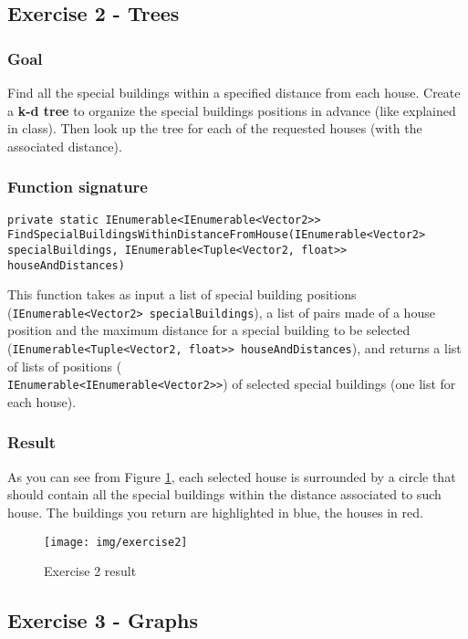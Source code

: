 \subsection*{Exercise 2 - Trees}

\subsubsection*{Goal}
Find all the special buildings within a specified distance from each house. Create a \textbf{k-d tree} to organize the special buildings positions in advance (like explained in class). Then look up the tree for each of the requested houses (with the associated distance).

\subsubsection*{Function signature} 
\begin{lstlisting}
private static IEnumerable<IEnumerable<Vector2>> FindSpecialBuildingsWithinDistanceFromHouse(IEnumerable<Vector2> specialBuildings, IEnumerable<Tuple<Vector2, float>> houseAndDistances)
\end{lstlisting}

\noindent
This function takes as input a list of special building positions (\texttt{IEnumerable<Vector2> specialBuildings}), a list of pairs made of a house position and the maximum distance for a special building to be selected (\texttt{IEnumerable<Tuple<Vector2, float>> houseAndDistances}), and returns a list of lists of positions (\\ \texttt{IEnumerable<IEnumerable<Vector2>>}) of selected special buildings (one list for each house).\\

\subsubsection*{Result}
As you can see from Figure \ref{img:Ex2}, each selected house is surrounded by a circle that should contain all the special buildings within the distance associated to such house. The buildings you return are highlighted in blue, the houses in red.

\begin{figure}[!h]
\centering
\texttt{[image: img/exercise2]}
\caption{Exercise 2 result}
\label{img:Ex2}
\end{figure}

\newpage
\subsection*{Exercise 3 - Graphs}

